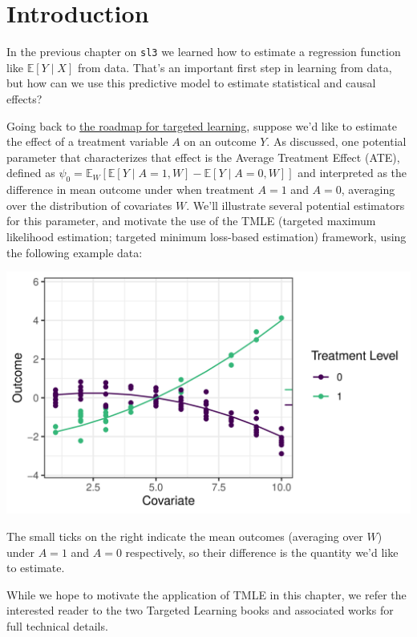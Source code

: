 \documentclass[
  12pt, krantz2,
]{krantz}
\newcommand{\passthrough}[1]{#1}
\newcommand{\1}{\mathbbm{1}}
\theoremstyle{definition}
\theoremstyle{definition}
\theoremstyle{definition}
\theoremstyle{definition}
\theoremstyle{remark}
\begin{document}
\hypertarget{tmle-intro}{%
\section{Introduction}\label{tmle-intro}}

In the previous chapter on \passthrough{\lstinline!sl3!} we learned how to estimate a regression
function like \(\mathbb{E}[Y \mid X]\) from data. That's an important first step
in learning from data, but how can we use this predictive model to estimate
statistical and causal effects?

Going back to \protect\hyperlink{roadmap}{the roadmap for targeted learning}, suppose we'd like to
estimate the effect of a treatment variable \(A\) on an outcome \(Y\). As discussed,
one potential parameter that characterizes that effect is the Average Treatment
Effect (ATE), defined as \(\psi_0 = \mathbb{E}_W[\mathbb{E}[Y \mid A=1,W] - \mathbb{E}[Y \mid A=0,W]]\) and interpreted as the difference in mean outcome
under when treatment \(A=1\) and \(A=0\), averaging over the distribution of
covariates \(W\). We'll illustrate several potential estimators for this
parameter, and motivate the use of the TMLE (targeted maximum likelihood
estimation; targeted minimum loss-based estimation) framework, using the
following example data:

\begin{center}\includegraphics[width=0.8\linewidth]{img/png/schematic_1_truedgd} \end{center}

The small ticks on the right indicate the mean outcomes (averaging over \(W\))
under \(A=1\) and \(A=0\) respectively, so their difference is the quantity we'd
like to estimate.

While we hope to motivate the application of TMLE in this chapter, we refer the
interested reader to the two Targeted Learning books and associated works for
full technical details.
\end{document}
